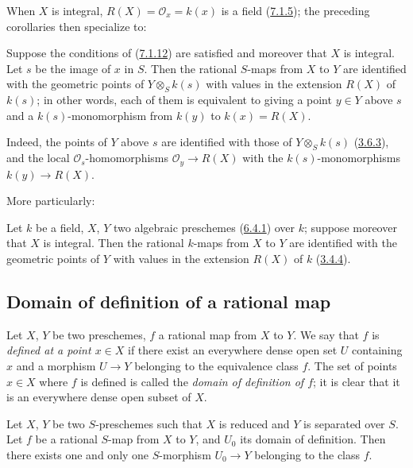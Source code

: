 When $X$ is integral, $R(X)=\mathscr{O}_x=k(x)$ is a field
(\hyperref[I.7.1.5]{7.1.5}); the preceding corollaries then specialize
to:

\begin{corollary}[7.1.15]
\label{I.7.1.15}
Suppose the conditions of (\hyperref[I.7.1.12]{7.1.12}) are satisfied and
moreover that $X$ is integral. Let $s$ be the image of $x$ in $S$. Then the
rational $S$-maps from $X$ to $Y$ are identified with the geometric points of
$Y\otimes_S k(s)$ with values in the extension $R(X)$ of $k(s)$; in other
words, each of them is equivalent to giving a point $y\in Y$ above $s$ and a
$k(s)$-monomorphism from $k(y)$ to
$k(x)=R(X)$.
\end{corollary}

Indeed, the points of $Y$ above $s$ are identified with those of
$Y\otimes_S k(s)$ (\hyperref[I.3.6.3]{3.6.3}), and the local
$\mathscr{O}_s$-homomorphisms $\mathscr{O}_y\to R(X)$ with the
$k(s)$-monomorphisms $k(y)\to R(X)$.

More particularly:

\begin{corollary}[7.1.16]
\label{I.7.1.16}
Let $k$ be a field, $X$, $Y$ two algebraic preschemes
(\hyperref[I.6.4.1]{6.4.1}) over $k$; suppose moreover that $X$ is
integral. Then the rational $k$-maps from $X$ to $Y$ are identified with the
geometric points of $Y$ with values in the extension $R(X)$ of $k$
(\hyperref[I.3.4.4]{3.4.4}).
\end{corollary}

\subsection{Domain of definition of a rational map}
\label{subsection:I.7.2}

\begin{env}[7.2.1]
\label{I.7.2.1}
Let $X$, $Y$ be two preschemes, $f$ a rational map from $X$ to $Y$. We say
that $f$ is \emph{defined at a point $x\in X$} if there exist an everywhere
dense open set $U$ containing $x$ and a morphism $U\to Y$ belonging to the
equivalence class $f$. The set of points $x\in X$ where $f$ is defined is
called the \emph{domain of definition of $f$}; it is clear that it is an
everywhere dense open subset of $X$.
\end{env}

\begin{proposition}[7.2.2]
\label{I.7.2.2}
Let $X$, $Y$ be two $S$-preschemes such that $X$ is reduced and $Y$ is
separated over $S$. Let $f$ be a rational $S$-map from $X$ to $Y$, and $U_0$
its domain of definition. Then there exists one and only one $S$-morphism
$U_0\to Y$ belonging to the class $f$.
\end{proposition}

